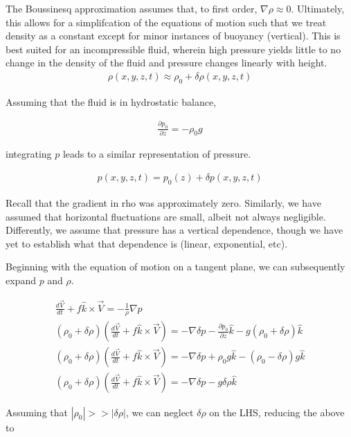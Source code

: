 \documentclass[a4paper,12pt]{article}
\begin{document}
The Boussinesq approximation assumes that, to first order, $\nabla \rho \approx 0$. Ultimately, this allows for a simplifcation of the equations of motion such that we treat density as a constant except for minor instances of buoyancy (vertical). This is best suited for an incompressible fluid, wherein high pressure yields little to no change in the density of the fluid and pressure changes linearly with height. 
\begin{align}
\rho(x,y,z,t) \approx \rho_0 + \delta \rho(x,y,z,t)
\end{align}

Assuming that the fluid is in hydrostatic balance,

\begin{align}
\frac{\partial p_0}{\partial z} = -\rho_0 g
\end{align}

integrating $p$ leads to a similar representation of pressure.

\begin{align}
p(x,y,z,t) = p_0(z) + \delta p(x,y,z,t)
\end{align}

Recall that the gradient in rho was approximately zero. Similarly, we have assumed that horizontal fluctuations are small, albeit not always negligible. Differently, we assume that pressure has a vertical dependence, though we have yet to establish what that dependence is (linear, exponential, etc).

Beginning with the equation of motion on a tangent plane, we can subsequently expand $p$ and $\rho$. 

\begin{align}
\frac{d\vec{V}}{dt} +  f\hat{k} \times \vec{V} = -\frac{1}{\rho}\nabla p\\
(\rho_0 + \delta \rho) \left(\frac{d\vec{V}}{dt} +  f\hat{k} \times \vec{V}\right) = -\nabla \delta p - \frac{\partial p_0}{\partial z}\hat{k} - g(\rho_0 + \delta \rho)\hat{k}\\
(\rho_0 + \delta \rho) \left(\frac{d\vec{V}}{dt} +  f\hat{k} \times \vec{V}\right) = -\nabla \delta p + \rho_0 g\hat{k} - (\rho_0 - \delta \rho)g\hat{k}\\
(\rho_0 + \delta \rho) \left(\frac{d\vec{V}}{dt} +  f\hat{k} \times \vec{V}\right) = -\nabla \delta p - g\delta\rho\hat{k}
\end{align}

Assuming that $|\rho_0| >> |\delta\rho|$, we can neglect $\delta\rho$ on the LHS, reducing the above to 
\end{document}
